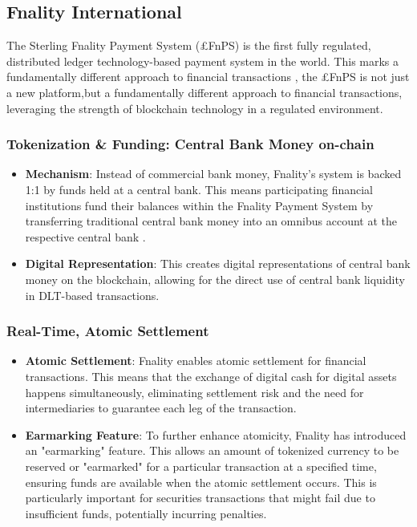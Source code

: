 \documentclass[conference]{IEEEtran}
\begin{document}
\subsection{Fnality International}
The Sterling Fnality Payment System (£FnPS) is the first fully regulated, distributed ledger technology-based payment system in the world\cite{b7}. This marks a fundamentally different approach to financial transactions , the £FnPS is not just a new platform,but a fundamentally different approach to financial transactions, leveraging the strength of blockchain technology in a regulated environment\cite{b8}.


\subsubsection{Tokenization \& Funding: Central Bank Money on-chain}

\begin{itemize}
\item \textbf{Mechanism}: Instead of commercial bank money, Fnality's system is backed 1:1 by funds held at a central bank. This means participating financial institutions fund their balances within the Fnality Payment System by transferring traditional central bank money into an omnibus account at the respective central bank .

\item \textbf{Digital Representation}: This creates digital representations of central bank money on the blockchain, allowing for the direct use of central bank liquidity in DLT-based transactions.
\end{itemize}

\subsubsection{Real-Time, Atomic Settlement}

\begin{itemize}
\item \textbf{Atomic Settlement}: Fnality enables atomic settlement for financial transactions. This means that the exchange of digital cash for digital assets happens simultaneously, eliminating settlement risk and the need for intermediaries to guarantee each leg of the transaction.

\item \textbf{Earmarking Feature}: To further enhance atomicity, Fnality has introduced an "earmarking" feature. This allows an amount of tokenized currency to be reserved or "earmarked" for a particular transaction at a specified time, ensuring funds are available when the atomic settlement occurs. This is particularly important for securities transactions that might fail due to insufficient funds, potentially incurring penalties.
\end{itemize}
\end{document}

